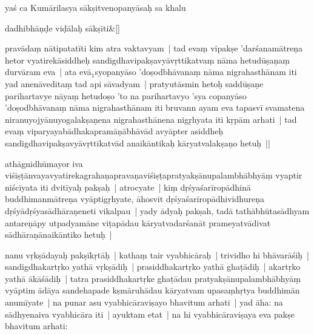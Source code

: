 \documentclass[article,12pt,a4paper]{memoir}%
\newcommand{\gap}[1]{}
\newcounter{parCount}
\begin{document}
	  
	  \pstart \leavevmode%
	\hphantom{.}\label{thakur75-43.20}yaś ca Kumārilasya sākṣitvenopanyāsaḥ sa khalu 
	    \pend%
	  
	    
	    \stanza[\smallbreak]
	  dadhibhāṇḍe viḍālaḥ sākṣīti\&[\smallbreak]
	  
	  
	  
	    \pstart  \leavevmode%
	    \hphantom{.}
	   pravādaṃ nātipatatīti kim atra vaktavyam | tad evaṃ vipakṣe 'darśanamātreṇa hetor vyatirekāsiddheḥ sandigdhavipakṣavyāvṛttikatvaṃ nāma hetudūṣaṇaṃ durvāram eva | ata evā{\tiny $_{1}$}syopanyāso 'doṣodbhāvanaṃ nāma nigrahasthānam iti yad anenāveditaṃ tad api sāvadyam | pratyutāsmin heto\gap{}ḥ saddūṣaṇe parihartavye nāyaṃ hetudoṣo 'to na parihartavyo 'sya copanyāso 'doṣodbhāvanaṃ nāma nigrahasthānam iti bruvann ayam eva tapasvī svamatena niranuyojyānuyogalakṣaṇena nigrahasthānena nigṛhyata iti kṛpām arhati | tad evaṃ viparyayabādhakapramāṇābhāvād avyāpter asiddheḥ sandigdhavipakṣavyāvṛttikatvād anaikāntikaḥ kāryatvalakṣaṇo hetuḥ ||
	{}
	\pend%
      
	  
	

	  
	  \pstart \leavevmode%
	\label{thakur75-43.30}athāgnidhūmayor iva viśiṣṭānvayavyatirekagrahaṇapravaṇaviśiṣṭapratyakṣānupalambhābhyāṃ vyaptir niścīyata iti dvitīyaḥ pakṣaḥ | atrocyate | kiṃ dṛśyaśarīropādhinā buddhimanmātreṇa vyāptigṛhyate, āhosvit dṛśyaśarīropādhividhureṇa dṛśyādṛśyasādhāraṇeneti vikalpau | yady ādyaḥ pakṣah, tadā tathābhūtasādhyam antareṇāpy utpadyamāne viṭapādau kāryatvadarśanāt prameyatvādivat sādhāraṇānaikāntiko hetuḥ |
	{}
	\pend%
      

	  
	  \pstart \leavevmode%
	\label{thakur75-44.2} nanu vṛkṣādayaḥ pakṣīkṛtāḥ | kathaṃ tair vyabhicāraḥ | trividho hi bhāvarāśiḥ | sandigdhakartṛko yathā vṛkṣādiḥ | prasiddhakartṛko yathā ghaṭādiḥ | akartṛko yathā ākāśādiḥ | tatra prasiddhakartṛke ghaṭādau pratyakṣānupalambhābhyāṃ vyāptim ādāya sandehapade kṣmāruhādau kāryatvam upasaṃhṛtya buddhimān anumīyate | na punar asu vyabhicāraviṣayo bhavitum arhati | \label{thakur75-44.8} yad āha: na sādhyenaiva vyabhicāra iti | ayuktam etat | na hi vyabhicāraviṣaya eva pakṣe bhavitum arhati:
	{}
	\pend%
      
\end{document}
